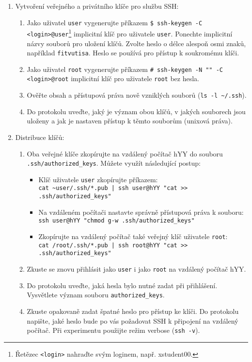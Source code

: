 \documentclass[a4paper,11pt]{article}
\begin{document}
\begin{enumerate}
  \item Vytvoření veřejného a privátního klíče pro službu SSH:
    \begin{enumerate}
      \item Jako uživatel {\tt user} vygenerujte příkazem \verb|$ ssh-keygen -C <login>@user|\footnote{Řetězec {\tt <login>} nahraďte svým loginem, např. xstudent00.} implicitní klíč pro uživatele {\tt user}. Ponechte implicitní názvy souborů pro uložení klíčů. Zvolte heslo o délce alespoň osmi znaků, například \texttt{fitvutisa}. Heslo se používá pro přístup k soukromému klíči.
      \item Jako uživatel {\tt root} vygenerujte příkazem \verb|# ssh-keygen -N "" -C <login>@root|
        implicitní klíč pro uživatele {\tt root} bez hesla.
      \item Ověřte obsah a přístupová práva nově vzniklých souborů (\verb|ls -l ~/.ssh|).
      \item Do protokolu uveďte, jaký je význam obou klíčů, v jakých souborech jsou uloženy a jak je nastaven přístup k těmto souborům (unixová práva).
    \end{enumerate}

  \item Distribuce klíčů:
    \begin{enumerate}
      \item Oba  veřejné klíče zkopírujte na vzdálený počítač hYY do souboru \verb|.ssh/authorized_keys|. Můžete využít následující postup:
        \begin{itemize}
          \item Klíč uživatele {\tt user} zkopírujte příkazem: \\
            {\verb&cat ~user/.ssh/*.pub | ssh user@hYY "cat >> .ssh/authorized_keys"&}
          \item Na vzdáleném počítači nastavte správně přístupová práva k souboru:\\
            {\verb&ssh user@hYY "chmod g-w .ssh/authorized_keys"&} 
          \item Zkopírujte na vzdálený počítač také veřejný klíč uživatele {\tt root}: \\
            {\verb&cat /root/.ssh/*.pub | ssh root@hYY "cat >> .ssh/authorized_keys"&}
        \end{itemize}
      \item Zkuste se znovu přihlásit jako \texttt{user} i jako \texttt{root} na vzdálený počítač hYY.

      \item Do protokolu uveďte, jaká hesla bylo nutné zadat při přihlášení. Vysvětlete význam souboru \texttt{authorized\_keys}.
      \item Zkuste opakovaně zadat špatné heslo pro přístup ke klíči. Do protokolu napište, jaké heslo bude po vás požadovat SSH k připojení na vzdálený počítač. Při experimentu použijte režim verbose (\texttt{ssh -v}).
    \end{enumerate}


\end{enumerate}
\end{document}
